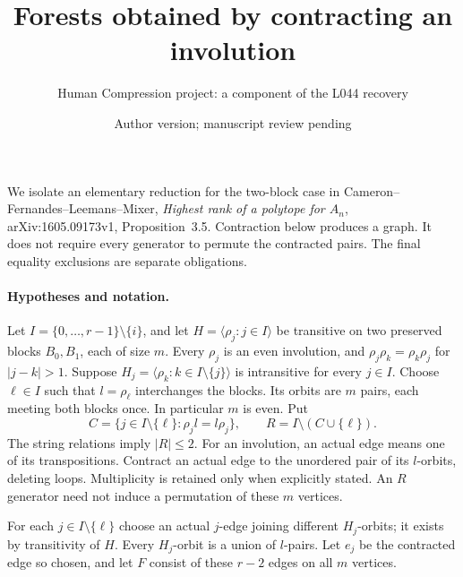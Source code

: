 \documentclass[11pt,a4paper]{article}
\title{Forests obtained by contracting an involution}
\author{Human Compression project: a component of the L044 recovery}
\date{Author version; manuscript review pending}
\newcommand{\gen}[1]{\langle#1\rangle}
\begin{document}
\maketitle

We isolate an elementary reduction for the two-block case in
Cameron--Fernandes--Leemans--Mixer, \emph{Highest rank of a polytope
for $A_n$}, arXiv:1605.09173v1, Proposition~3.5. Contraction below
produces a graph. It does not require every generator to permute the
contracted pairs. The final equality exclusions are separate obligations.

\paragraph{Hypotheses and notation.}
Let $I=\{0,\ldots,r-1\}\setminus\{i\}$, and let
$H=\gen{\rho_j:j\in I}$ be transitive on two preserved blocks
$B_0,B_1$, each of size $m$. Every $\rho_j$ is an even involution,
and $\rho_j\rho_k=\rho_k\rho_j$ for $|j-k|>1$.
Suppose $H_j=\gen{\rho_k:k\in I\setminus\{j\}}$ is
intransitive for every $j\in I$. Choose $\ell\in I$ such that
$l=\rho_\ell$ interchanges the blocks. Its orbits are $m$ pairs,
each meeting both blocks once. In particular $m$ is even. Put
\[
 C=\{j\in I\setminus\{\ell\}:\rho_jl=l\rho_j\},\qquad
 R=I\setminus(C\cup\{\ell\}).
\]
The string relations imply $|R|\le2$. For an involution, an actual
edge means one of its transpositions. Contract an actual edge to
the unordered pair of its $l$-orbits, deleting loops. Multiplicity
is retained only when explicitly stated. An $R$ generator need
not induce a permutation of these $m$ vertices.

For each $j\in I\setminus\{\ell\}$ choose an actual $j$-edge
joining different $H_j$-orbits; it exists by transitivity of $H$.
Every $H_j$-orbit is a union of $l$-pairs. Let $e_j$ be the
contracted edge so chosen, and let $F$ consist of these $r-2$ edges
on all $m$ vertices.
\end{document}

